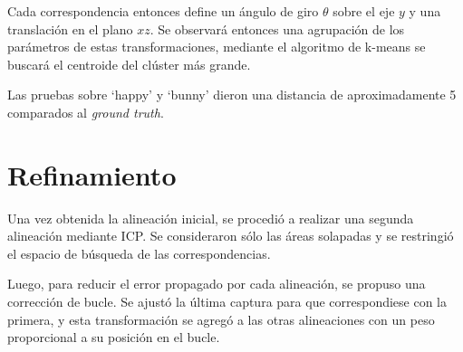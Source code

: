 	Cada correspondencia entonces define un ángulo de giro $\theta$ sobre el
	eje $y$ y una translación en el plano $xz$.
	Se observará entonces una agrupación de los parámetros de estas
	transformaciones, mediante el algoritmo de k-means se buscará el centroide
	del clúster más grande.

	Las pruebas sobre `happy' y `bunny' dieron una distancia de aproximadamente
	5 %
	comparados al \emph{ground truth}.


	\section{Refinamiento}
	Una vez obtenida la alineación inicial, se procedió a realizar una segunda
	alineación mediante ICP.
	Se consideraron sólo las áreas solapadas y se restringió el
	espacio de búsqueda de las correspondencias.

	Luego, para reducir el error propagado por cada alineación, se propuso una
	corrección de bucle.
	Se ajustó la última captura para que correspondiese con la primera, y
	esta transformación se agregó a las otras alineaciones con un peso
	proporcional a su posición en el bucle.




